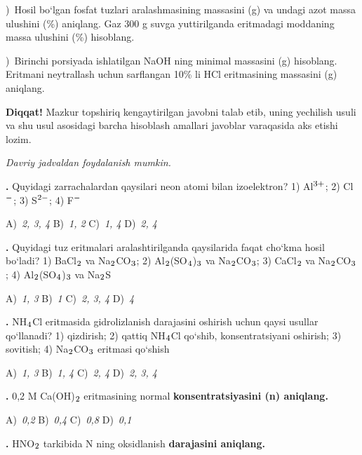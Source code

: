 \documentclass[11pt,a4paper]{article}
\renewcommand{\textsubscript}[1]{\ensuremath{_{\text{\fontsize{8}{8}\selectfont #1}}}}
\renewcommand{\textsuperscript}[1]{\ensuremath{^{\text{\fontsize{8}{8}\selectfont #1}}}}
\newcommand{\qn}[1]{\textbf{\fontsize{11.5}{13}\selectfont #1}}
\newcommand{\qsep}{\par\vspace{13pt}}
\newcommand{\diqqat}[1]{\par\smallskip\noindent\textbf{Diqqat!} #1\par\medskip}
\newcommand{\hdrpill}[1]{\begin{tikzpicture}[baseline=0pt]\node[fill=ygreen,text=white,rounded corners=8pt,inner xsep=10pt,inner ysep=5pt,font=\fontsize{13}{15}\bfseries\selectfont] at (0,0.475){#1};\end{tikzpicture}}
\newcommand{\curvar}{}\fancyhead[R]{\hdrpill{\curvar}}
\begin{document}
)\ Hosil bo`lgan fosfat tuzlari aralashmasining massasini (g) va undagi azot massa ulushini (\%) aniqlang. Gaz 300 g suvga yuttirilganda eritmadagi moddaning massa ulushini (\%) hisoblang.\par
{})\ Birinchi porsiyada ishlatilgan NaOH ning minimal massasini (g) hisoblang. Eritmani neytrallash uchun sarflangan 10\% li HCl eritmasining massasini (g) aniqlang.\par
\diqqat{Mazkur topshiriq kengaytirilgan javobni talab etib, uning yechilish usuli va shu usul asosidagi barcha hisoblash amallari javoblar varaqasida aks etishi lozim.}\qsep
\newpage
\renewcommand{\curvar}{9-variant}
\thispagestyle{first}
\noindent\textit{Davriy jadvaldan foydalanish mumkin.}
\par\smallskip
\begin{multicols}{2}
\noindent\qn{1.} Quyidagi zarrachalardan qaysilari neon atomi bilan izoelektron? 1) Al\textsuperscript{3+}; 2) Cl\textsuperscript{$-$}; 3) S\textsuperscript{2$-$}; 4) F\textsuperscript{$-$}

\noindent A)~\textsl{2, 3, 4} \hfill B)~\textsl{1, 2} \hfill C)~\textsl{1, 4} \hfill D)~\textsl{2, 4}\par
\qsep
\noindent\qn{2.} Quyidagi tuz eritmalari aralashtirilganda qaysilarida faqat cho`kma hosil bo`ladi? 1) BaCl\textsubscript{2} va Na\textsubscript{2}CO\textsubscript{3}; 2) Al\textsubscript{2}(SO\textsubscript{4})\textsubscript{3} va Na\textsubscript{2}CO\textsubscript{3}; 3) CaCl\textsubscript{2} va Na\textsubscript{2}CO\textsubscript{3}; 4) Al\textsubscript{2}(SO\textsubscript{4})\textsubscript{3} va Na\textsubscript{2}S

\noindent A)~\textsl{1, 3} \hfill B)~\textsl{1} \hfill C)~\textsl{2, 3, 4} \hfill D)~\textsl{4}\par
\qsep
\noindent\qn{3.} NH\textsubscript{4}Cl eritmasida gidrolizlanish darajasini oshirish uchun qaysi usullar qo`llanadi? 1) qizdirish; 2) qattiq NH\textsubscript{4}Cl qo`shib, konsentratsiyani oshirish; 3) sovitish; 4) Na\textsubscript{2}CO\textsubscript{3} eritmasi qo`shish

\noindent A)~\textsl{1, 3} \hfill B)~\textsl{1, 4} \hfill C)~\textsl{2, 4} \hfill D)~\textsl{2, 3, 4}\par
\qsep
\noindent\qn{4.} 0,2 M Ca(OH)\textsubscript{2} eritmasining normal \textbf{konsentratsiyasini (n) aniqlang.}

\noindent A)~\textsl{0,2} \hfill B)~\textsl{0,4} \hfill C)~\textsl{0,8} \hfill D)~\textsl{0,1}\par
\qsep
\noindent\qn{5.} HNO\textsubscript{2} tarkibida N ning oksidlanish \textbf{darajasini aniqlang.}


\end{multicols}
\end{document}
